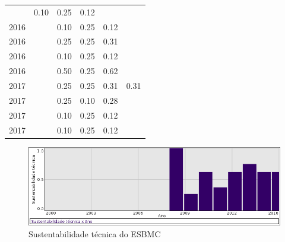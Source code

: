 \begin{table}[H]
\begin{tabular}{| l | c | c | c | c | c |}
          &
          0.10
          &
          0.25
          &
          0.12
          &
          \\
            2016
          &
          
          &
          0.10
          &
          0.25
          &
          0.12
          &
          \\
            2016
          &
          
          &
          0.25
          &
          0.25
          &
          0.31
          &
          \\
            2016
          &
          
          &
          0.10
          &
          0.25
          &
          0.12
          &
          \\
            2016
          &
          
          &
          0.50
          &
          0.25
          &
          0.62
          &
          \\
\hline
            2017
          &
          
          &
          0.25
          &
          0.25
          &
          0.31
          &
            {\color{red} 0.31}
          \\
            2017
          &
          
          &
          0.25
          &
          0.10
          &
          0.28
          &
          \\
            2017
          &
          
          &
          0.10
          &
          0.25
          &
          0.12
          &
          \\
            2017
          &
          
          &
          0.10
          &
          0.25
          &
          0.12
          &
          \\
\hline
\end{tabular}
\end{table}

\begin{figure}[h]
  \center
  \includegraphics[scale=0.50]{result-documents/charts/esbmc.png}
  \caption{Sustentabilidade técnica do ESBMC}
\end{figure}



